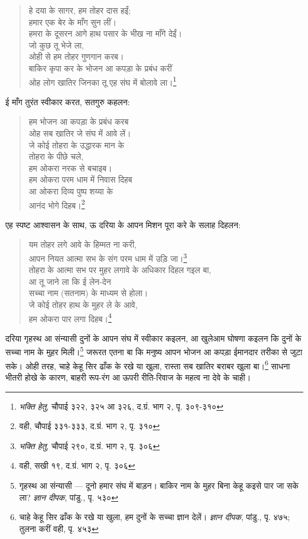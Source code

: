 \begin{quote}
हे दया के सागर, हम तोहर दास हईं; \\
हमार एक बेर के माँग सुन लीं। \\
हमरा के दूसरन आगे हाथ पसार के भीख ना माँगे देईं। \\
जो कुछ तू भेजे ला, \\
ओही से हम तोहर गुणगान करब। \\
बाकिर कृपा कर के भोजन आ कपड़ा के प्रबंध करीं \\
ओह लोग खातिर जिनका तू एह संघ में बोलावे ला।\footnote{\textit{भक्ति हेतु}, चौपाई ३२२, ३२५ आ ३२६, द.ग्रं. भाग २, पृ. ३०९-३१०}
\end{quote}

ई माँग तुरंत स्वीकार करत, सतगुरु कहलन:

\begin{quote}
हम भोजन आ कपड़ा के प्रबंध करब \\
ओह सब खातिर जे संघ में आवे लें। \\
जे कोई तोहरा के उद्धारक मान के \\
तोहरा के पीछे चले, \\
हम ओकरा नरक से बचाइब। \\
हम ओकरा परम धाम में निवास दिहब \\
आ ओकरा दिव्य पुष्प शय्या के \\
आनंद भोगे दिहब।\footnote{वही, चौपाई ३३१-३३३, द.ग्रं. भाग २, पृ. ३१०}
\end{quote}

एह स्पष्ट आश्वासन के साथ, ऊ दरिया के आपन मिशन पूरा करे के सलाह दिहलन:

\begin{quote}
यम तोहर लगे आवे के हिम्मत ना करी, \\
आपन नियत आत्मा सभ के संग परम धाम में उड़ि जा।\footnote{\textit{भक्ति हेतु}, चौपाई २९०, द.ग्रं. भाग २, पृ. ३०६} \\
तोहरा के आत्मा सभ पर मुहर लगावे के अधिकार दिहल गइल बा, \\
आ तू जाने ला कि ई लेन-देन \\
सच्चा नाम (सतनाम) के माध्यम से होला। \\
जे कोई तोहर हाथ के मुहर ले के आवे, \\
हम ओकरा पार लगा दिहब।\footnote{वही, सखी १९, द.ग्रं. भाग २, पृ. ३०६}
\end{quote}

दरिया गृहस्थ आ संन्यासी दुनों के आपन संघ में स्वीकार कइलन, आ खुलेआम घोषणा कइलन कि दुनों के सच्चा नाम के मुहर मिली।\footnote{गृहस्थ आ संन्यासी — दूनो हमार संघ में बाड़न। बाकिर नाम के मुहर बिना केहू कइसे पार जा सके ला? \textit{ज्ञान दीपक}, पांडु., पृ. ५३०} जरूरत एतना बा कि मनुष्य आपन भोजन आ कपड़ा ईमानदार तरीका से जुटा सके। ओही तरह, चाहे केहू सिर ढाँक के रखे या खुला, रास्ता सब खातिर बराबर खुला बा।\footnote{चाहे केहू सिर ढाँक के रखे या खुला, हम दुनों के सच्चा ज्ञान देलें। \textit{ज्ञान दीपक}, पांडु., पृ. ४७५; तुलना करीं वही, पृ. ४५३} साधना भीतरी होखे के कारण, बाहरी रूप-रंग आ ऊपरी रीति-रिवाज के महत्व ना देवे के चाही।

